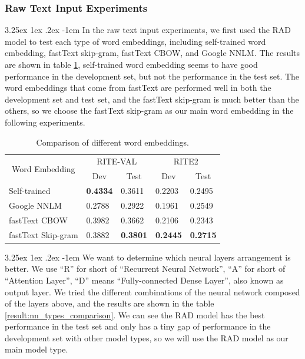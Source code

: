\documentclass[12pt]{article}
\makeatletter
\renewcommand\paragraph{\@startsection{paragraph}{5}{\z@}%
  {3.25ex \@plus1ex \@minus.2ex}%
  {-1em}%
  {\normalfont\normalsize\bfseries}}
\makeatother
\begin{document}
\begin{CJK*}{UTF8}{bkai}
\begin{spacing}{1.77}
\subsubsection{Raw Text Input Experiments}
\paragraph{}
In the raw text input experiments, we first used the RAD model to test each type of word embeddings, including self-trained word embedding, fastText skip-gram, fastText CBOW, and Google NNLM. The results are shown in table \ref{result:nnlm_comparison}, self-trained word embedding seems to have good performance in the development set, but not the performance in the test set. The word embeddings that come from fastText are performed well in both the development set and test set, and the fastText skip-gram is much better than the others, so we choose the fastText skip-gram as our main word embedding in the following experiments.

\begin{table}[H]
  \centering
  \setlength{\extrarowheight}{-3pt}
  \begin{tabular}{|l|l|l|l|l|}
  \hline
  \multicolumn{1}{|c|}{\multirow{2}{*}{Word   Embedding}} & \multicolumn{2}{c|}{RITE-VAL} & \multicolumn{2}{c|}{RITE2} \\ \cline{2-5}
  \multicolumn{1}{|c|}{} & \multicolumn{1}{c|}{Dev} & \multicolumn{1}{c|}{Test} & \multicolumn{1}{c|}{Dev} & \multicolumn{1}{c|}{Test} \\ \hline
  Self-trained & \textbf{0.4334} & 0.3611 & 0.2203 & 0.2495 \\ \hline
  Google NNLM & 0.2788 & 0.2922 & 0.1961 & 0.2549 \\ \hline
  fastText CBOW & 0.3982 & 0.3662 & 0.2106 & 0.2343 \\ \hline
  fastText Skip-gram & 0.3882 & \textbf{0.3801} & \textbf{0.2445} & \textbf{0.2715} \\ \hline
  \end{tabular}
  \caption{Comparison of different word embeddings.}
  \label{result:nnlm_comparison}
\end{table}

\paragraph{}
We want to determine which neural layers arrangement is better. We use ``R'' for short of ``Recurrent Neural Network'', ``A'' for short of ``Attention Layer'', ``D'' means ``Fully-connected Dense Layer'', also known as output layer. We tried the different combinations of the neural network composed of the layers above, and the results are shown in the table \ref{result:nn_types_comparison}. We can see the RAD model has the best performance in the test set and only has a tiny gap of performance in the development set with other model types, so we will use the RAD model as our main model type.


\end{spacing}
\end{CJK*}
\end{document}
